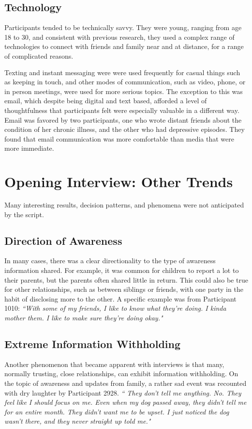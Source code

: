   \subsection{Technology}
  Participants tended to be technically savvy.
  They were young, ranging from age 18 to 30,
  and consistent with previous research,
  they used a complex range of technologies to connect
  with friends and family near and at distance,
  for a range of complicated reasons.

  Texting and instant messaging were
  were used frequently for casual things such as keeping in touch,
  and other modes of communication, such as video, phone, or in person meetings,
  were used for more serious topics.
  The exception to this was email,
  which despite being digital and text based, 
  afforded a level of thoughtfulness that participants
  felt were especially valuable in a different way.
  Email was favored by two participants, one who wrote distant friends about
  the condition of her chronic illness,
  and the other who had depressive episodes.
  They found that email communication was more comfortable than media
  that were more immediate.

\section{Opening Interview: Other Trends}
  Many interesting results, decision patterns, and phenomena
  were not anticipated by the script.

  \subsection{Direction of Awareness}
  In many cases, there was a clear directionality to the type of awareness
  information shared.
  For example, it was common for children to report a lot to their parents,
  but the parents often shared little in return.
  This could also be true for other relationships,
  such as between siblings or friends,
  with one party in the habit of disclosing more to the other.
  A specific example was from Participant 1010:
  \textit{
  ``With some of my friends, I like to know what they're doing.
  I kinda mother them.
  I like to make sure they're doing okay."
  }

  \subsection{Extreme Information Withholding}
  Another phenomenon that became apparent with interviews is that
  many, normally trusting, close relationships,
  can exhibit information withholding.
  On the topic of awareness and updates from family,
  a rather sad event was recounted with dry laughter by Participant 2928.
  \textit{
    ``
    They don't tell me anything. No.
    They feel like I should focus on me.
    Even when my dog passed away, they didn't tell me for an entire month.
    They didn't want me to be upset.
    I just noticed the dog wasn't there, and they never straight up told me."
  }

